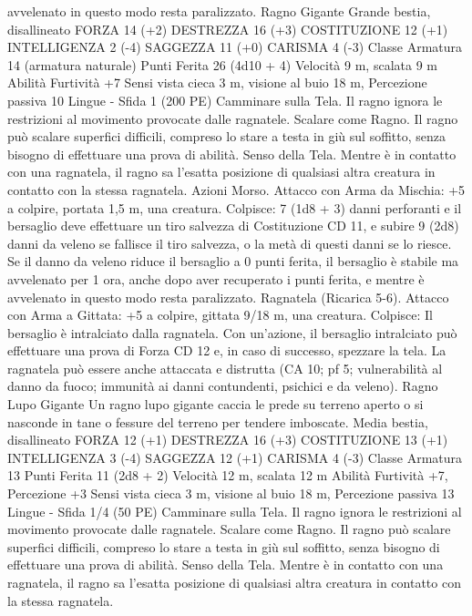 \begin{multicols}{2}
avvelenato in questo modo resta paralizzato.
Ragno Gigante
Grande bestia, disallineato
FORZA 14 (+2)
DESTREZZA 16 (+3)
COSTITUZIONE 12 (+1)
INTELLIGENZA 2 (-4)
SAGGEZZA 11 (+0)
CARISMA 4 (-3)
Classe Armatura 14 (armatura naturale)
Punti Ferita 26 (4d10 + 4)
Velocità 9 m, scalata 9 m
Abilità Furtività +7
Sensi vista cieca 3 m, visione al buio 18 m, Percezione passiva
10
Lingue -
Sfida 1 (200 PE)
Camminare sulla Tela. Il ragno ignora le restrizioni al
movimento provocate dalle ragnatele.
Scalare come Ragno. Il ragno può scalare superfici difficili,
compreso lo stare a testa in giù sul soffitto, senza bisogno di
effettuare una prova di abilità.
Senso della Tela. Mentre è in contatto con una ragnatela, il
ragno sa l’esatta posizione di qualsiasi altra creatura in contatto
con la stessa ragnatela.
Azioni
Morso. Attacco con Arma da Mischia: +5 a colpire, portata 1,5
m, una creatura.
Colpisce: 7 (1d8 + 3) danni perforanti e il bersaglio deve
effettuare un tiro salvezza di Costituzione CD 11, e subire 9
(2d8) danni da veleno se fallisce il tiro salvezza, o la metà di
questi danni se lo riesce. Se il danno da veleno riduce il bersaglio
a 0 punti ferita, il bersaglio è stabile ma avvelenato per 1 ora,
anche dopo aver recuperato i punti ferita, e mentre è avvelenato
in questo modo resta paralizzato.
Ragnatela (Ricarica 5-6). Attacco con Arma a Gittata: +5 a
colpire, gittata 9/18 m, una creatura.
Colpisce: Il bersaglio è intralciato dalla ragnatela. Con
un’azione, il bersaglio intralciato può effettuare una prova di
Forza CD 12 e, in caso di successo, spezzare la tela. La ragnatela
può essere anche attaccata e distrutta (CA 10; pf 5; vulnerabilità
al danno da fuoco; immunità ai danni contundenti, psichici e da
veleno).
Ragno Lupo Gigante
Un ragno lupo gigante caccia le prede su terreno aperto
o si nasconde in tane o fessure del terreno per tendere
imboscate.
Media bestia, disallineato
FORZA 12 (+1)
DESTREZZA 16 (+3)
COSTITUZIONE 13 (+1)
INTELLIGENZA 3 (-4)
SAGGEZZA 12 (+1)
CARISMA 4 (-3)
Classe Armatura 13
Punti Ferita 11 (2d8 + 2)
Velocità 12 m, scalata 12 m
Abilità Furtività +7, Percezione +3
Sensi vista cieca 3 m, visione al buio 18 m, Percezione passiva
13
Lingue -
Sfida 1/4 (50 PE)
Camminare sulla Tela. Il ragno ignora le restrizioni al
movimento provocate dalle ragnatele.
Scalare come Ragno. Il ragno può scalare superfici difficili,
compreso lo stare a testa in giù sul soffitto, senza bisogno di
effettuare una prova di abilità.
Senso della Tela. Mentre è in contatto con una ragnatela, il
ragno sa l’esatta posizione di qualsiasi altra creatura in contatto
con la stessa ragnatela.

\end{multicols}
